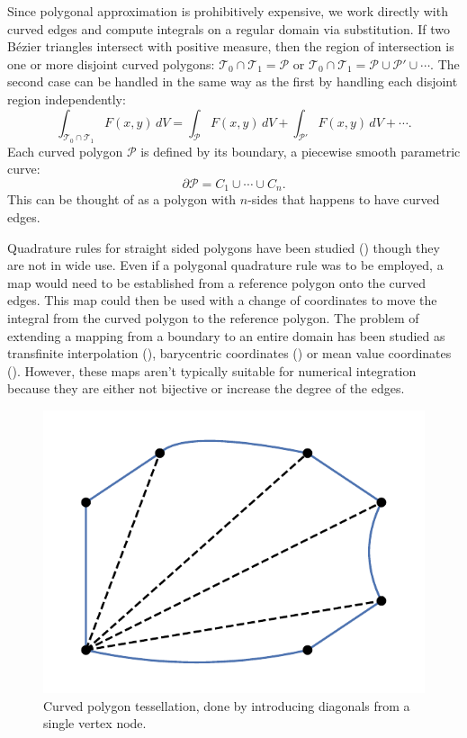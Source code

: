 Since polygonal approximation is prohibitively expensive,
we work directly with curved edges and compute integrals on a regular
domain via substitution.
If two B\'{e}zier triangles intersect with positive measure, then
the region of intersection is one or more disjoint curved polygons:
\(\mathcal{T}_0 \cap \mathcal{T}_1 = \mathcal{P}\) or
\(\mathcal{T}_0 \cap \mathcal{T}_1 = \mathcal{P} \cup
\mathcal{P}' \cup \cdots\).
The second case can be handled in the same way as the first by handling each
disjoint region independently:
\begin{equation}
\int_{\mathcal{T}_0 \cap \mathcal{T}_1} F(x, y) \, dV =
  \int_{\mathcal{P}} F(x, y) \, dV +
  \int_{\mathcal{P}'} F(x, y) \, dV + \cdots.
\end{equation}
Each curved polygon \(\mathcal{P}\) is defined by its boundary, a
piecewise smooth parametric curve:
\begin{equation}
\partial \mathcal{P} = C_1 \cup \cdots \cup C_n.
\end{equation}
This can be thought of as a polygon with \(n\)-sides that happens to
have curved edges.

Quadrature rules for straight sided polygons have been
studied (\cite{Mousavi2009}) though they are not in wide use. Even
if a polygonal quadrature rule was to be employed, a map would need to be
established from a reference polygon onto the curved edges. This map
could then be used with a change of coordinates to move the integral
from the curved polygon to the reference polygon. The problem of extending
a mapping from a boundary to an entire domain has been studied as
transfinite interpolation
(\cite{chenin:tel-00284680, Gordon1982, Perronnet1998}),
barycentric coordinates (\cite{Wachspress1975}) or mean value coordinates
(\cite{Floater2003}). However, these maps aren't typically suitable for
numerical integration because they are either not bijective or increase the
degree of the edges.

\begin{figure}
  \includegraphics{../images/curved-mesh/main_figure11.pdf}
  \centering
  \captionsetup{width=.75\linewidth}
  \caption{Curved polygon tessellation, done by introducing diagonals
    from a single vertex node.}
  \label{fig:tessellated-curved-polygon}
\end{figure}

